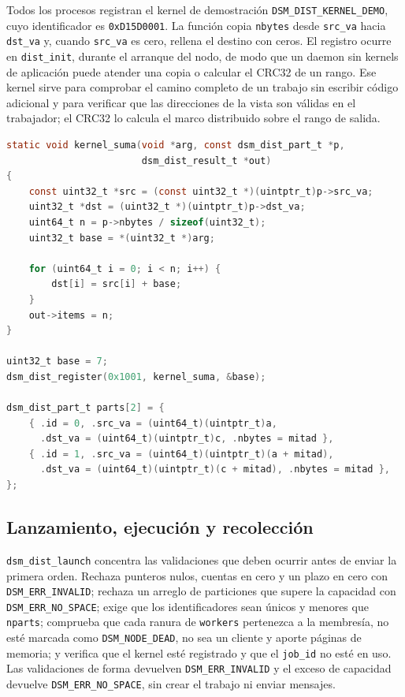 Todos los procesos registran el kernel de demostración \texttt{DSM\_DIST\_KERNEL\_DEMO}, cuyo identificador es \texttt{0xD15D0001}. La función copia \texttt{nbytes} desde \texttt{src\_va} hacia \texttt{dst\_va} y, cuando \texttt{src\_va} es cero, rellena el destino con ceros. El registro ocurre en \texttt{dist\_init}, durante el arranque del nodo, de modo que un daemon sin kernels de aplicación puede atender una copia o calcular el CRC32 de un rango. Ese kernel sirve para comprobar el camino completo de un trabajo sin escribir código adicional y para verificar que las direcciones de la vista son válidas en el trabajador; el CRC32 lo calcula el marco distribuido sobre el rango de salida.

\begin{lstlisting}[language=C, caption={Registro de un kernel y descripción de una partición.}, label={lst:dist-registro}]
static void kernel_suma(void *arg, const dsm_dist_part_t *p,
                        dsm_dist_result_t *out)
{
    const uint32_t *src = (const uint32_t *)(uintptr_t)p->src_va;
    uint32_t *dst = (uint32_t *)(uintptr_t)p->dst_va;
    uint64_t n = p->nbytes / sizeof(uint32_t);
    uint32_t base = *(uint32_t *)arg;

    for (uint64_t i = 0; i < n; i++) {
        dst[i] = src[i] + base;
    }
    out->items = n;
}

uint32_t base = 7;
dsm_dist_register(0x1001, kernel_suma, &base);

dsm_dist_part_t parts[2] = {
    { .id = 0, .src_va = (uint64_t)(uintptr_t)a,
      .dst_va = (uint64_t)(uintptr_t)c, .nbytes = mitad },
    { .id = 1, .src_va = (uint64_t)(uintptr_t)(a + mitad),
      .dst_va = (uint64_t)(uintptr_t)(c + mitad), .nbytes = mitad },
};
\end{lstlisting}

\subsection{Lanzamiento, ejecución y recolección}

\texttt{dsm\_dist\_launch} concentra las validaciones que deben ocurrir antes de enviar la primera orden. Rechaza punteros nulos, cuentas en cero y un plazo en cero con \texttt{DSM\_ERR\_INVALID}; rechaza un arreglo de particiones que supere la capacidad con \texttt{DSM\_ERR\_NO\_SPACE}; exige que los identificadores sean únicos y menores que \texttt{nparts}; comprueba que cada ranura de \texttt{workers} pertenezca a la membresía, no esté marcada como \texttt{DSM\_NODE\_DEAD}, no sea un cliente y aporte páginas de memoria; y verifica que el kernel esté registrado y que el \texttt{job\_id} no esté en uso. Las validaciones de forma devuelven \texttt{DSM\_ERR\_INVALID} y el exceso de capacidad devuelve \texttt{DSM\_ERR\_NO\_SPACE}, sin crear el trabajo ni enviar mensajes.

